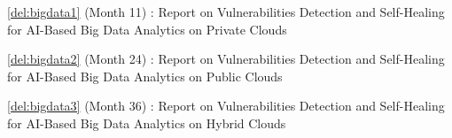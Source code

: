 \begin{Workpackage}{\thewpno}





\begin{WPDeliverables}
  \begin{compactitem}
\item \ref{del:bigdata1} (Month 11) : Report on Vulnerabilities Detection and Self-Healing for AI-Based Big Data Analytics on Private Clouds
 \item \ref{del:bigdata2} (Month 24) : Report on Vulnerabilities Detection and Self-Healing for AI-Based Big Data Analytics on Public Clouds 
 \item \ref{del:bigdata3} (Month 36) : Report on Vulnerabilities Detection and Self-Healing for AI-Based Big Data Analytics on Hybrid Clouds      
\end{compactitem}
\end{WPDeliverables}
\end{Workpackage}
